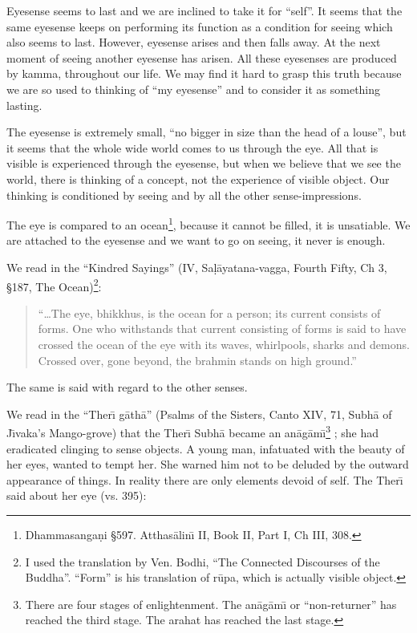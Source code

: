 \documentclass{book}
\begin{document}
Eyesense seems to last and we are inclined to take it for ``self''. It
seems that the same eyesense keeps on performing its function as a
condition for seeing which also seems to last. However, eyesense arises
and then falls away. At the next moment of seeing another eyesense has
arisen. All these eyesenses are produced by kamma, throughout our life.
We may find it hard to grasp this truth because we are so used to
thinking of ``my eyesense'' and to consider it as something lasting. 

The eyesense is extremely small, ``no bigger in size than the head of a
louse'', but it seems that the whole wide world comes to us through
the eye. All that is visible is experienced through the eyesense, but
when we believe that we see the world, there is thinking of a concept,
not the experience of visible object. Our thinking is conditioned by
seeing and by all the other sense-impressions. 

The eye is compared to an ocean\footnote{Dhamma\-sanga\d ni {\S}597.
Atthas{\=a}lin\=\i{} II, Book II, Part I, Ch III, 308.}, because it cannot
be filled, it is unsatiable. We are attached to the eyesense and we
want to go on seeing, it never is enough.

We read in the ``Kindred Sayings'' (IV, Sa\d l{\=a}yatana-vagga, Fourth
Fifty, Ch 3, {\S}187, The Ocean)\footnote{I used the
translation by Ven. Bodhi, ``The Connected Discourses of the Buddha''.
``Form'' is his translation of r\=upa, which is actually visible
object. }:




\begin{quote}\begin{flushleft}
``\ldots The eye, bhikkhus, is the ocean for a person; its current consists
of forms. One who withstands that current consisting of forms is said
to have crossed the ocean of the eye with its waves, whirlpools, sharks
and demons. Crossed over, gone beyond, the brahmin stands on high
ground.'' 
\end{flushleft}\end{quote}

The same is said with regard to the other senses.

We read in the ``Ther\=\i{} g{\=a}th{\=a}'' (Psalms of the Sisters, Canto
XIV, 71, Subh{\=a} of J\=\i vaka's Mango-grove) that the Ther\=\i{}  
Subh{\=a} became an an{\=a}g{\=a}m\=\i\footnote{There are four stages
of enlightenment. The an{\=a}g{\=a}m\=\i{} or ``non-returner'' has
reached the third stage. The arahat has reached the last stage.} ; she
had eradicated clinging to sense objects. A young man, infatuated with
the beauty of her eyes, wanted to tempt her. She warned him not to be
deluded by the outward appearance of things. In reality there are only
elements devoid of self. The Ther\=\i{}  said about her eye (vs. 395):
\end{document}

